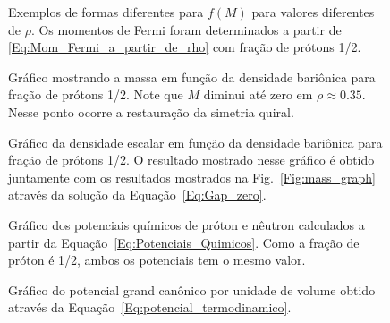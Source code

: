 \vspace{1cm}

\begin{figure}
	
	\caption{Exemplos de formas diferentes para $f(M)$ para valores diferentes de $\rho$. Os momentos de Fermi foram determinados a partir de \eqref{Eq:Mom_Fermi_a_partir_de_rho} com fração de prótons 1/2. \protect}
	\label{Fig:Gap_zero_graph_eNJL1m}
\end{figure}

\begin{figure}
	
	\caption{Gráfico mostrando a massa em função da densidade bariônica para fração de prótons 1/2. Note que $M$ diminui até zero em $\rho \approx 0.35$. Nesse ponto ocorre a restauração da simetria quiral. \protect}
	\label{Fig:mass_graph_eNJL1m}
\end{figure}

\begin{figure}
	
	\caption{Gráfico da densidade escalar em função da densidade bariônica para fração de prótons 1/2. O resultado mostrado nesse gráfico é obtido juntamente com os resultados mostrados na Fig.~\ref{Fig:mass_graph} através da solução da Equação~\ref{Eq:Gap_zero}. \protect}
	\label{Fig:scalar_density_graph_eNJL1m}
\end{figure}

\begin{figure}
	
	\caption{Gráfico dos potenciais químicos de próton e nêutron calculados a partir da Equação~\eqref{Eq:Potenciais_Quimicos}. Como a fração de próton é 1/2, ambos os potenciais tem o mesmo valor. \protect}
	\label{Fig:chemical_potential_graph_eNJL1m}
\end{figure}

\FloatBarrier

\begin{figure}
	
	\caption{Gráfico do potencial grand canônico por unidade de volume obtido através da Equação~\eqref{Eq:potencial_termodinamico}. \protect}
	\label{Fig:thermodynamic_potential_graph_eNJL1m}
\end{figure}


